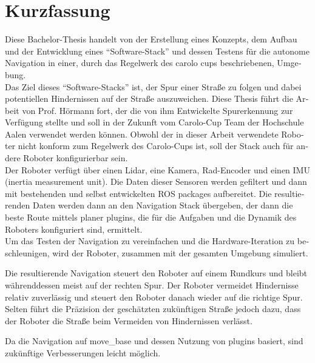 \chapter*{Kurzfassung}
\label{kurzfassung}

\begin{otherlanguage}{ngerman}

Diese Bachelor-Thesis handelt von der Erstellung eines Konzepts, dem Aufbau und der Entwicklung eines ``Software-Stack'' und dessen Testens für die autonome Navigation in einer, durch das Regelwerk des carolo cups beschriebenen, Umgebung.\\

Das Ziel dieses ``Software-Stacks'' ist, der Spur einer Straße zu folgen und dabei potentiellen Hindernissen auf der Straße auszuweichen. Diese Thesis führt die Arbeit von Prof. Hörmann fort, der die von ihm Entwickelte Spurerkennung zur Verfügung stellte und soll in der Zukunft vom Carolo-Cup Team der Hochschule Aalen verwendet werden können. Obwohl der in dieser Arbeit verwendete Roboter nicht konform zum Regelwerk des Carolo-Cups ist, soll der Stack auch für andere Roboter konfigurierbar sein.\\

Der Roboter verfügt über einen Lidar, eine Kamera, Rad-Encoder und einen IMU (inertia measurement unit). Die Daten dieser Sensoren werden gefiltert und dann mit bestehenden und selbst entwickelten ROS packages aufbereitet. Die resultierenden Daten werden dann an den Navigation Stack  übergeben, der dann die beste Route mittels planer plugins, die für die Aufgaben und die Dynamik des Roboters konfiguriert sind, ermittelt.\\

Um das Testen der Navigation zu vereinfachen und die Hardware-Iteration zu beschleunigen, wird der Roboter, zusammen mit der gesamten Umgebung simuliert.

Die resultierende Navigation steuert den Roboter auf einem Rundkurs und bleibt währenddessen meist auf der rechten Spur. Der Roboter vermeidet Hindernisse relativ zuverlässig und steuert den Roboter danach wieder auf die richtige Spur. Selten führt die Präzision der geschätzten zukünftigen Straße jedoch dazu, dass der Roboter die Straße beim Vermeiden von Hindernissen verlässt.

Da die Navigation auf move\_base und dessen Nutzung von plugins basiert, sind zukünftige Verbesserungen leicht möglich.

\end{otherlanguage}
